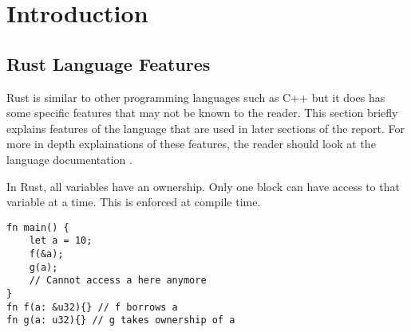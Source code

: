 \chapter{Introduction}


\section{Rust Language Features}
Rust is similar to other programming languages such as C++ but it does has some specific features that may not be known to the reader. This section briefly explains features of the language that are used in later sections of the report. For more in depth explainations of these features, the reader should look at the language documentation \parencite{rustbook}.

In Rust, all variables have an ownership. Only one block can have access to that variable at a time. This is enforced at compile time.

\begin{verbatim}
fn main() {
    let a = 10;
    f(&a);
    g(a);
    // Cannot access a here anymore
}
fn f(a: &u32){} // f borrows a
fn g(a: u32){} // g takes ownership of a
\end{verbatim}

